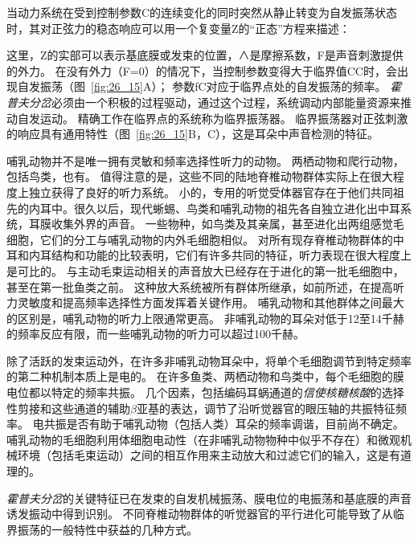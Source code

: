 \begin{proposition} \label{box:26_1}
	
	\quad \quad 当动力系统在受到控制参数C的连续变化的同时突然从静止转变为自发振荡状态时，其对正弦力的稳态响应可以用一个复变量Z的“正态”方程来描述：
	
	\quad \quad 这里，Z的实部可以表示基底膜或发束的位置，∧是摩擦系数，F是声音刺激提供的外力。
	在没有外力（F=0）的情况下，当控制参数变得大于临界值CC时，会出现自发振荡（图~\ref{fig:26_15}A）；
	参数fC对应于临界点处的自发振荡的频率。
	\textit{霍普夫分岔}必须由一个积极的过程驱动，通过这个过程，系统调动内部能量资源来推动自发运动。
	精确工作在临界点的系统称为临界振荡器。
	临界振荡器对正弦刺激的响应具有通用特性（图~\ref{fig:26_15}B，C），这是耳朵中声音检测的特征。
	
	\quad \quad 哺乳动物并不是唯一拥有灵敏和频率选择性听力的动物。
	两栖动物和爬行动物，包括鸟类，也有。
	值得注意的是，这些不同的陆地脊椎动物群体实际上在很大程度上独立获得了良好的听力系统。
	小的，专用的听觉受体器官存在于他们共同祖先的内耳中。很久以后，现代蜥蜴、鸟类和哺乳动物的祖先各自独立进化出中耳系统，耳膜收集外界的声音。
	一些物种，如鸟类及其亲属，甚至进化出两组感觉毛细胞，它们的分工与哺乳动物的内外毛细胞相似。
	对所有现存脊椎动物群体的中耳和内耳结构和功能的比较表明，它们有许多共同的特征，听力表现在很大程度上是可比的。
	与主动毛束运动相关的声音放大已经存在于进化的第一批毛细胞中，甚至在第一批鱼类之前。
	这种放大系统被所有群体所继承，如前所述，在提高听力灵敏度和提高频率选择性方面发挥着关键作用。
	哺乳动物和其他群体之间最大的区别是，哺乳动物的听力上限通常更高。
	非哺乳动物的耳朵对低于12至14千赫的频率反应有限，而一些哺乳动物的听力可以超过100千赫。
	
	\quad \quad 除了活跃的发束运动外，在许多非哺乳动物耳朵中，将单个毛细胞调节到特定频率的第二种机制本质上是电的。
	在许多鱼类、两栖动物和鸟类中，每个毛细胞的膜电位都以特定的频率共振。
	几个因素，包括编码耳蜗通道的\textit{信使核糖核酸}的选择性剪接和这些通道的辅助$β$亚基的表达，调节了沿听觉器官的眼压轴的共振特征频率。
	电共振是否有助于哺乳动物（包括人类）耳朵的频率调谐，目前尚不确定。
	哺乳动物的毛细胞利用体细胞电动性（在非哺乳动物物种中似乎不存在）和微观机械环境（包括毛束运动）之间的相互作用来主动放大和过滤它们的输入，这是有道理的。
	
	\quad \quad \textit{霍普夫分岔}的关键特征已在发束的自发机械振荡、膜电位的电振荡和基底膜的声音诱发振动中得到识别。
	不同脊椎动物群体的听觉器官的平行进化可能导致了从临界振荡的一般特性中获益的几种方式。
	
\end{proposition}


